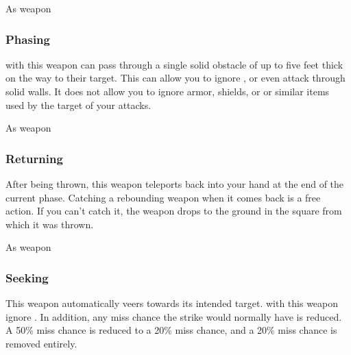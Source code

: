  


 As weapon


\lowercase{\hypertarget{item:Phasing}{}}\label{item:Phasing}
\hypertarget{item:Phasing}{\subsubsection{Phasing\hfill{}}}

 with this weapon can pass through a single solid obstacle of up to five feet thick on the way to their target.
This can allow you to ignore , or even attack through solid walls.
It does not allow you to ignore armor, shields, or or similar items used by the target of your attacks.



 


 As weapon


\lowercase{\hypertarget{item:Returning}{}}\label{item:Returning}
\hypertarget{item:Returning}{\subsubsection{Returning\hfill{}}}

After being thrown, this weapon teleports back into your hand at the end of the current phase.
Catching a rebounding weapon when it comes back is a free action.
If you can't catch it, the weapon drops to the ground in the square from which it was thrown.



 


 As weapon


\lowercase{\hypertarget{item:Seeking}{}}\label{item:Seeking}
\hypertarget{item:Seeking}{\subsubsection{Seeking\hfill{}}}

This weapon automatically veers towards its intended target.
 with this weapon ignore .
In addition, any miss chance the strike would normally have is reduced.
A 50\% miss chance is reduced to a 20\% miss chance, and a 20\% miss chance is removed entirely.



 


